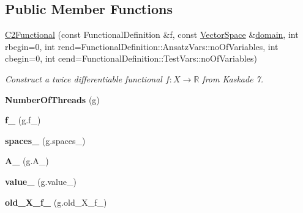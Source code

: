 \subsection*{Public Member Functions}
\begin{DoxyCompactItemize}
\item 
\hyperlink{classSpacy_1_1Kaskade_1_1C2Functional_a35511ed1de0b2599efa901f27793dbdc}{C2\-Functional} (const Functional\-Definition \&f, const \hyperlink{classSpacy_1_1VectorSpace}{Vector\-Space} \&\hyperlink{classSpacy_1_1FunctionalBase_a2d3397deb9fa1ad85ed04e37a03b3aa6}{domain}, int rbegin=0, int rend=Functional\-Definition\-::\-Ansatz\-Vars\-::no\-Of\-Variables, int cbegin=0, int cend=Functional\-Definition\-::\-Test\-Vars\-::no\-Of\-Variables)
\begin{DoxyCompactList}\small\item\em Construct a twice differentiable functional $f: X\rightarrow \mathbb{R}$ from Kaskade 7. \end{DoxyCompactList}\item 
\hypertarget{classSpacy_1_1Kaskade_1_1C2Functional_ac74a454a44bdb24c484ac21e5f510dcf}{{\bfseries Number\-Of\-Threads} (g)}\label{classSpacy_1_1Kaskade_1_1C2Functional_ac74a454a44bdb24c484ac21e5f510dcf}

\item 
\hypertarget{classSpacy_1_1Kaskade_1_1C2Functional_a5ba70db6e6ca12902f095b0d5de48749}{{\bfseries f\-\_\-} (g.\-f\-\_\-)}\label{classSpacy_1_1Kaskade_1_1C2Functional_a5ba70db6e6ca12902f095b0d5de48749}

\item 
\hypertarget{classSpacy_1_1Kaskade_1_1C2Functional_a3de900f8fac6e4e91be19d254586a1f6}{{\bfseries spaces\-\_\-} (g.\-spaces\-\_\-)}\label{classSpacy_1_1Kaskade_1_1C2Functional_a3de900f8fac6e4e91be19d254586a1f6}

\item 
\hypertarget{classSpacy_1_1Kaskade_1_1C2Functional_ae7ad8ac9409c2f593510f8a54c49783c}{{\bfseries A\-\_\-} (g.\-A\-\_\-)}\label{classSpacy_1_1Kaskade_1_1C2Functional_ae7ad8ac9409c2f593510f8a54c49783c}

\item 
\hypertarget{classSpacy_1_1Kaskade_1_1C2Functional_a49f95c673c4e7de34bf1c6c0198f6103}{{\bfseries value\-\_\-} (g.\-value\-\_\-)}\label{classSpacy_1_1Kaskade_1_1C2Functional_a49f95c673c4e7de34bf1c6c0198f6103}

\item 
\hypertarget{classSpacy_1_1Kaskade_1_1C2Functional_a234297689b87c5d511da1fb7d57b2980}{{\bfseries old\-\_\-\-X\-\_\-f\-\_\-} (g.\-old\-\_\-\-X\-\_\-f\-\_\-)}\label{classSpacy_1_1Kaskade_1_1C2Functional_a234297689b87c5d511da1fb7d57b2980}


\end{DoxyCompactItemize}
